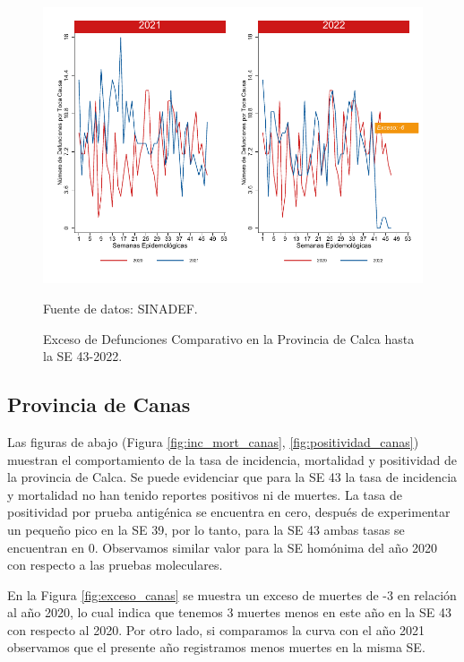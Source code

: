 \documentclass[12pt,a4paper,openany]{book}
\begin{document}
	\begin{figure}[h]
		\caption{Exceso de Defunciones Comparativo en la Provincia de Calca hasta la SE 43-2022.}\label{fig:exceso_calca}
		\begin{center}
			\includegraphics[width=0.7\linewidth]{../figuras/exceso_3.pdf}
		\end{center}
		{\footnotesize {Fuente de datos: SINADEF.}}
	\end{figure}
	
	\clearpage
	
	\subsection*{Provincia de Canas}
	\noindent Las figuras de abajo (Figura \ref{fig:inc_mort_canas}, \ref{fig:positividad_canas}) muestran el comportamiento de la tasa de incidencia, mortalidad y  positividad de  la provincia de Calca. Se puede evidenciar que para la SE 43 la tasa de incidencia y mortalidad no han tenido reportes positivos ni de muertes. La tasa de positividad por prueba antigénica se encuentra en cero, después de experimentar un pequeño pico en la SE 39, por lo tanto, para la SE 43 ambas tasas se encuentran en 0.
	Observamos similar valor para la SE homónima del año 2020 con respecto a las pruebas moleculares.
	
	En la Figura \ref{fig:exceso_canas} se muestra un exceso de muertes de -3 en relación al año 2020, lo cual indica que tenemos 3 muertes menos en este año en la SE 43 con respecto al 2020. Por otro lado, si comparamos la curva con el año 2021 observamos que el presente año registramos menos muertes en la misma SE.
	
\end{document}
